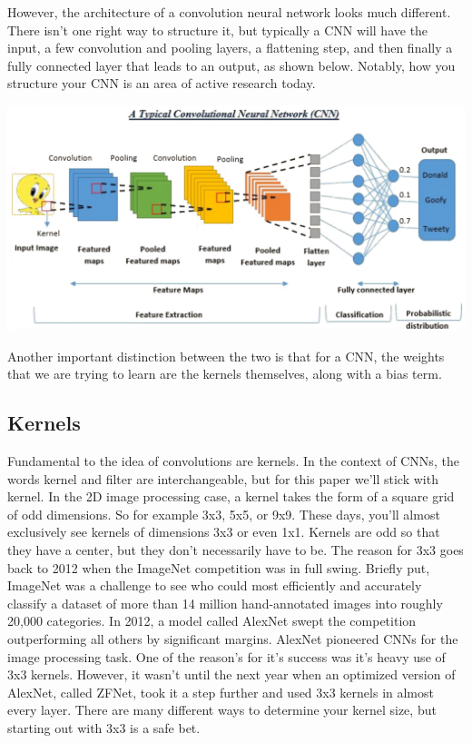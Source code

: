 \documentclass{article}
\begin{document}
        However, the architecture of a convolution neural network looks much different. There isn't one right way to structure it, but typically a CNN will have the input, a few convolution and pooling layers, a flattening step, and then finally a fully connected layer that leads to an output, as shown below. Notably, how you structure your CNN is an area of active research today.
        
        \begin{center}
            \includegraphics[scale=0.3]{images/CNN.jpg}
        \end{center}
        
        Another important distinction between the two is that for a CNN, the weights that we are trying to learn are the kernels themselves, along with a bias term.

    \subsection{Kernels}
        Fundamental to the idea of convolutions are kernels. In the context of CNNs, the words kernel and filter are interchangeable, but for this paper we'll stick with kernel. In the 2D image processing case, a kernel takes the form of a square grid of odd dimensions. So for example 3x3, 5x5, or 9x9. These days, you'll almost exclusively see kernels of dimensions 3x3 or even 1x1. Kernels are odd so that they have a center, but they don't necessarily have to be. The reason for 3x3 goes back to 2012 when the ImageNet competition was in full swing. Briefly put, ImageNet was a challenge to see who could most efficiently and accurately classify a dataset of more than 14 million hand-annotated images into roughly 20,000 categories. In 2012, a model called AlexNet swept the competition outperforming all others by significant margins. AlexNet pioneered CNNs for the image processing task. One of the reason's for it's success was it's heavy use of 3x3 kernels. However, it wasn't until the next year when an optimized version of AlexNet, called ZFNet, took it a step further and used 3x3 kernels in almost every layer. There are many different ways to determine your kernel size, but starting out with 3x3 is a safe bet.
        
\end{document}
